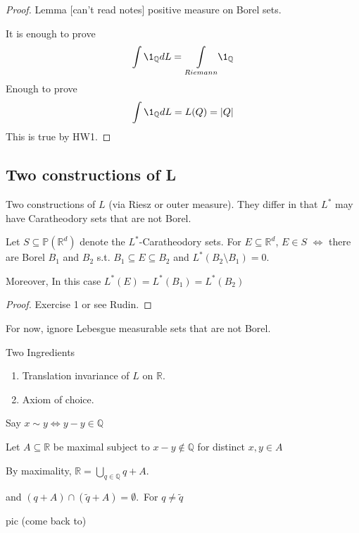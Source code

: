 \begin{proof}
	Lemma [can't read notes] positive measure on Borel sets.

	It is enough to prove 
	\begin{align*}
	\int \1_{\mathbb{Q}} dL = \underset{Riemann}{\int} \1_{\mathbb{Q}}
	\end{align*} Enough to prove
	\begin{align*}
		\int \1_{\mathbb{Q}} dL = L(Q) = |Q|
	\end{align*} 
	This is true by HW1.
\end{proof}

\subsection{Two constructions of L}

	Two constructions of $L$ (via Riesz or outer measure). They differ in that $L^*$ may have Caratheodory sets that are not Borel.

\begin{theorem}
	Let $S \subseteq \mathbb{P}(\mathbb{R}^d)$ denote the $L^*$-Caratheodory sets. For $E \subseteq 
	\mathbb{R}^d$, $E \in S$ $\iff$ there are Borel $B_1$ and $B_2$ s.t. $B_1 \subseteq E \subseteq B_2$ and
	$L^*(B_2 \setminus B_1) = 0$.

	Moreover, In this case  $L^*(E) = L^*(B_1) = L^*(B_2)$
\end{theorem}
\begin{proof}
	Exercise 1 or see Rudin.
\end{proof}

For now, ignore Lebesgue measurable sets that are not Borel.

\begin{example}
	Two Ingredients
	\begin{enumerate}
		\item Translation invariance of $L$ on $\mathbb{R}$.
		\item Axiom of choice.
	\end{enumerate}

	Say $x \sim y \iff y - y \in  \mathbb{Q}$

	Let $A \subseteq \mathbb{R}$ be maximal subject to $x - y \notin \mathbb{Q}$ for distinct $x,y \in A$

	By maximality,  $\mathbb{R} = \bigcup_{q \in \mathbb{Q}} q + A$.

	and $(q + A) \cap (\tilde{q} + A) = \emptyset$.\,  For $q \neq \tilde{q}$
\end{example}
pic (come back to)

